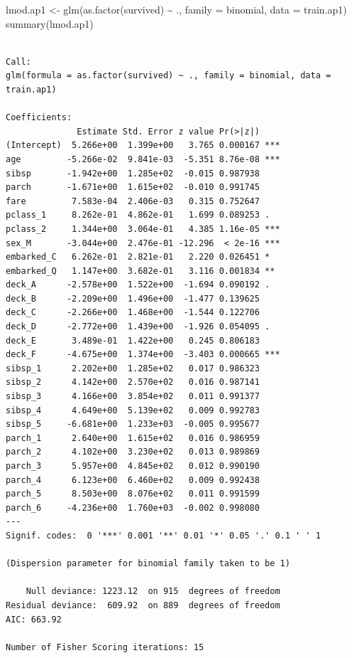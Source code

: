 \documentclass[
  letterpaper,
  DIV=11,
  numbers=noendperiod]{scrartcl}
\newenvironment{Shaded}{\begin{snugshade}}{\end{snugshade}}
\newcommand{\AttributeTok}[1]{\textcolor[rgb]{0.40,0.45,0.13}{#1}}
\newcommand{\FunctionTok}[1]{\textcolor[rgb]{0.28,0.35,0.67}{#1}}
\newcommand{\NormalTok}[1]{\textcolor[rgb]{0.00,0.23,0.31}{#1}}
\newcommand{\OtherTok}[1]{\textcolor[rgb]{0.00,0.23,0.31}{#1}}
\newcommand{\SpecialCharTok}[1]{\textcolor[rgb]{0.37,0.37,0.37}{#1}}
\begin{document}
\begin{Shaded}
\begin{Highlighting}[]
\NormalTok{lmod.ap1 }\OtherTok{\textless{}{-}} \FunctionTok{glm}\NormalTok{(}\FunctionTok{as.factor}\NormalTok{(survived) }\SpecialCharTok{\textasciitilde{}}\NormalTok{ ., }\AttributeTok{family =}\NormalTok{ binomial, }\AttributeTok{data =}\NormalTok{ train.ap1)}
\FunctionTok{summary}\NormalTok{(lmod.ap1)}
\end{Highlighting}
\end{Shaded}

\begin{verbatim}

Call:
glm(formula = as.factor(survived) ~ ., family = binomial, data = train.ap1)

Coefficients:
              Estimate Std. Error z value Pr(>|z|)    
(Intercept)  5.266e+00  1.399e+00   3.765 0.000167 ***
age         -5.266e-02  9.841e-03  -5.351 8.76e-08 ***
sibsp       -1.942e+00  1.285e+02  -0.015 0.987938    
parch       -1.671e+00  1.615e+02  -0.010 0.991745    
fare         7.583e-04  2.406e-03   0.315 0.752647    
pclass_1     8.262e-01  4.862e-01   1.699 0.089253 .  
pclass_2     1.344e+00  3.064e-01   4.385 1.16e-05 ***
sex_M       -3.044e+00  2.476e-01 -12.296  < 2e-16 ***
embarked_C   6.262e-01  2.821e-01   2.220 0.026451 *  
embarked_Q   1.147e+00  3.682e-01   3.116 0.001834 ** 
deck_A      -2.578e+00  1.522e+00  -1.694 0.090192 .  
deck_B      -2.209e+00  1.496e+00  -1.477 0.139625    
deck_C      -2.266e+00  1.468e+00  -1.544 0.122706    
deck_D      -2.772e+00  1.439e+00  -1.926 0.054095 .  
deck_E       3.489e-01  1.422e+00   0.245 0.806183    
deck_F      -4.675e+00  1.374e+00  -3.403 0.000665 ***
sibsp_1      2.202e+00  1.285e+02   0.017 0.986323    
sibsp_2      4.142e+00  2.570e+02   0.016 0.987141    
sibsp_3      4.166e+00  3.854e+02   0.011 0.991377    
sibsp_4      4.649e+00  5.139e+02   0.009 0.992783    
sibsp_5     -6.681e+00  1.233e+03  -0.005 0.995677    
parch_1      2.640e+00  1.615e+02   0.016 0.986959    
parch_2      4.102e+00  3.230e+02   0.013 0.989869    
parch_3      5.957e+00  4.845e+02   0.012 0.990190    
parch_4      6.123e+00  6.460e+02   0.009 0.992438    
parch_5      8.503e+00  8.076e+02   0.011 0.991599    
parch_6     -4.236e+00  1.760e+03  -0.002 0.998080    
---
Signif. codes:  0 '***' 0.001 '**' 0.01 '*' 0.05 '.' 0.1 ' ' 1

(Dispersion parameter for binomial family taken to be 1)

    Null deviance: 1223.12  on 915  degrees of freedom
Residual deviance:  609.92  on 889  degrees of freedom
AIC: 663.92

Number of Fisher Scoring iterations: 15
\end{verbatim}
\end{document}
